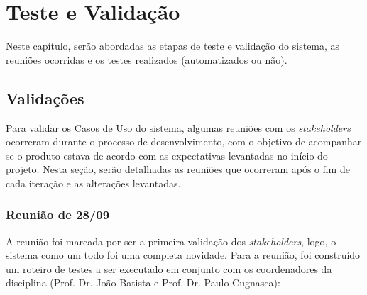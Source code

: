 \chapter{Teste e Validação}\label{chap:teste-validacao}
Neste capítulo, serão abordadas as etapas de teste e validação do sistema, as reuniões ocorridas e os testes realizados (automatizados ou não).

\section{Validações}
Para validar os Casos de Uso do sistema, algumas reuniões com os \textit{stakeholders} ocorreram durante o processo de desenvolvimento, com o objetivo de acompanhar se o produto estava de acordo com as expectativas levantadas no início do projeto. Nesta seção, serão detalhadas as reuniões que ocorreram após o fim de cada iteração e as alterações levantadas.

\subsection{Reunião de 28/09}
A reunião foi marcada por ser a primeira validação dos \textit{stakeholders}, logo, o sistema como um todo foi uma completa novidade. Para a reunião, foi construído um roteiro de testes a ser executado em conjunto com os coordenadores da disciplina (Prof. Dr. João Batista e Prof. Dr. Paulo Cugnasca):

